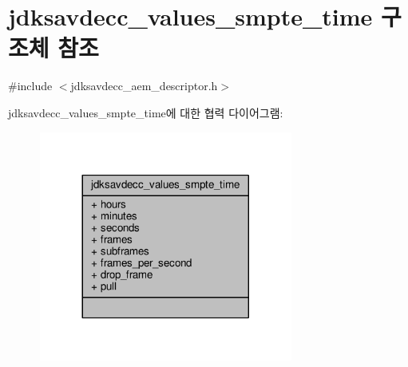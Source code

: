 \hypertarget{structjdksavdecc__values__smpte__time}{}\section{jdksavdecc\+\_\+values\+\_\+smpte\+\_\+time 구조체 참조}
\label{structjdksavdecc__values__smpte__time}


{\ttfamily \#include $<$jdksavdecc\+\_\+aem\+\_\+descriptor.\+h$>$}



jdksavdecc\+\_\+values\+\_\+smpte\+\_\+time에 대한 협력 다이어그램\+:
\nopagebreak
\begin{figure}[H]
\begin{center}
\leavevmode
\includegraphics[width=236pt]{structjdksavdecc__values__smpte__time__coll__graph}
\end{center}
\end{figure}
